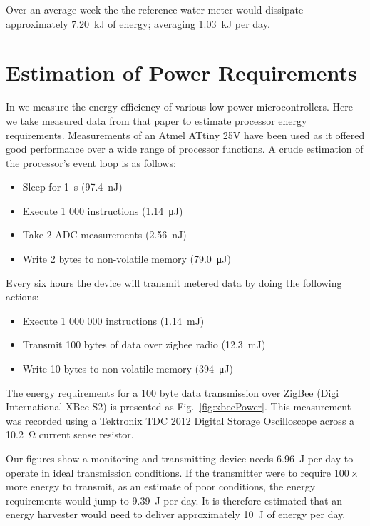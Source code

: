 \documentclass[10pt,final,journal]{IEEEtran}
\begin{document}
    Over an average week the the reference water meter would dissipate approximately \SI{7.20}{\kilo\joule} of energy; averaging \SI{1.03}{\kilo\joule} per day.

    \section{Estimation of Power Requirements}
    \label{sect:powerRequirements}
    In \cite{Jones2011} we measure the energy efficiency of various low-power microcontrollers.
    Here we take measured data from that paper to estimate processor energy requirements.
    Measurements of an Atmel ATtiny 25V have been used as it offered good performance over a wide range of processor functions.
    A crude estimation of the processor's event loop is as follows:
    \begin{itemize}
    \item Sleep for \SI{1}{\second} (\SI{97.4}{\nano\joule})
    \item Execute 1 000 instructions (\SI{1.14}{\micro\joule})
    \item Take 2 ADC measurements (\SI{2.56}{\nano\joule})
    \item Write 2 bytes to non-volatile memory (\SI{79.0}{\micro\joule})
    \end{itemize}
    Every six hours the device will transmit metered data by doing the following actions:
    \begin{itemize}
    \item Execute 1 000 000 instructions (\SI{1.14}{\milli\joule})
    \item Transmit 100 bytes of data over zigbee radio (\SI{12.3}{\milli\joule})
    \item Write 10 bytes to non-volatile memory (\SI{394}{\micro\joule})
    \end{itemize}

    The energy requirements for a 100 byte data transmission over ZigBee (Digi International XBee S2) is presented as Fig.~\ref{fig:xbeePower}.
    This measurement was recorded using a Tektronix TDC 2012 Digital Storage Oscilloscope across a \SI{10.2}{\ohm} current sense resistor.

    Our figures show a monitoring and transmitting device needs \SI{6.96}{\joule} per day to operate in ideal transmission conditions.
    If the transmitter were to require $100\times$ more energy to transmit, as an estimate of poor conditions, the energy requirements would jump to \SI{9.39}{\joule} per day.
    It is therefore estimated that an energy harvester would need to deliver approximately \SI{10}{\joule} of energy per day.
\end{document}
